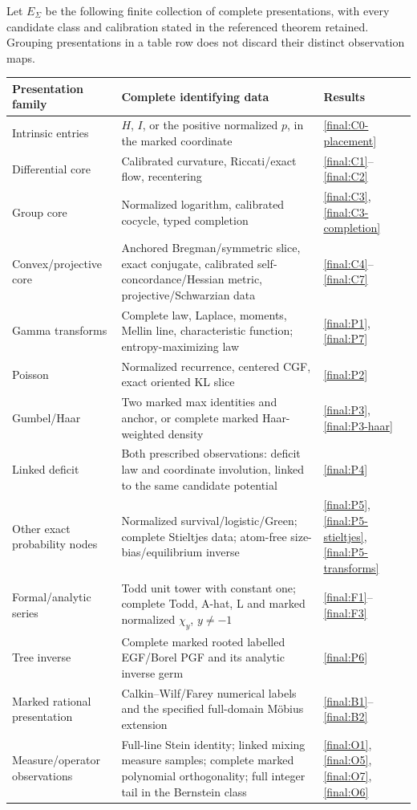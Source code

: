 Let $E_\Sigma$ be the following finite collection of complete presentations,
with every candidate class and calibration stated in the referenced
theorem retained. Grouping presentations in a table row does not discard
their distinct observation maps.
\begin{longtable}{@{}>{\raggedright\arraybackslash}p{}
>{\raggedright\arraybackslash}p{}
>{\raggedright\arraybackslash}p{}@{}}
\toprule
Presentation family&Complete identifying data&Results\\\midrule
\endhead
Intrinsic entries&$H$, $I$, or the positive normalized $p$, in the marked
coordinate&\ref{final:C0-placement}\\
Differential core&Calibrated curvature, Riccati/exact flow, recentering&
\ref{final:C1}--\ref{final:C2}\\
Group core&Normalized logarithm, calibrated cocycle, typed completion&
\ref{final:C3}, \ref{final:C3-completion}\\
Convex/projective core&Anchored Bregman/symmetric slice, exact conjugate,
calibrated self-concordance/Hessian metric, projective/Schwarzian data&
\ref{final:C4}--\ref{final:C7}\\
Gamma transforms&Complete law, Laplace, moments, Mellin line, characteristic
function; entropy-maximizing law&\ref{final:P1}, \ref{final:P7}\\
Poisson&Normalized recurrence, centered CGF, exact oriented KL slice&
\ref{final:P2}\\
Gumbel/Haar&Two marked max identities and anchor, or complete marked
Haar-weighted density&\ref{final:P3}, \ref{final:P3-haar}\\
Linked deficit&Both prescribed observations: deficit law and coordinate
involution, linked to the same candidate potential&\ref{final:P4}\\
Other exact probability nodes&Normalized survival/logistic/Green;
complete Stieltjes data; atom-free size-bias/equilibrium inverse&
\ref{final:P5}, \ref{final:P5-stieltjes},
\ref{final:P5-transforms}\\
Formal/analytic series&Todd unit tower with constant one; complete
Todd, A-hat, L and marked normalized $\chi_y$, $y\ne-1$&
\ref{final:F1}--\ref{final:F3}\\
Tree inverse&Complete marked rooted labelled EGF/Borel PGF and its
analytic inverse germ&\ref{final:P6}\\
Marked rational presentation&Calkin--Wilf/Farey numerical labels and
the specified full-domain M\"obius extension&\ref{final:B1}--\ref{final:B2}\\
Measure/operator observations&Full-line Stein identity; linked mixing
measure samples; complete marked polynomial orthogonality; full integer
tail in the Bernstein class&\ref{final:O1}, \ref{final:O5},
\ref{final:O7}, \ref{final:O6}\\
\bottomrule
\end{longtable}
